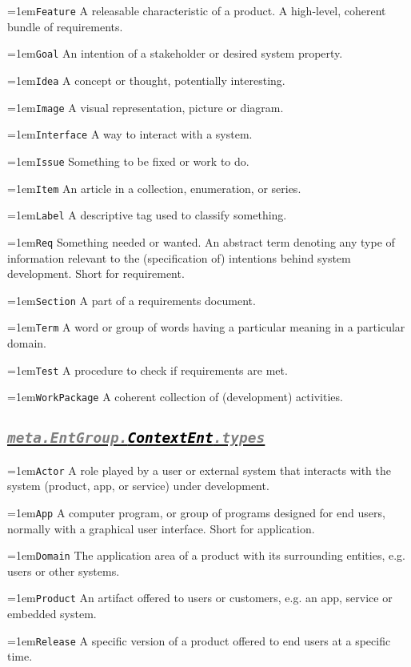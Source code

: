 \documentclass[a4paper,oneside]{article}
\newcommand\Concept[2]{\hangindent=1em\lstinline+#1+ #2}
\begin{document}
\begin{multicols*}{4}
\Concept{Feature}{A releasable characteristic of a product. A high-level, coherent bundle of requirements.}

\Concept{Goal}{An intention of a stakeholder or desired system property.}

\Concept{Idea}{A concept or thought, potentially interesting.}

\Concept{Image}{A visual representation, picture or diagram.}

\Concept{Interface}{A way to interact with a system.}

\Concept{Issue}{Something to be fixed or work to do.}

\Concept{Item}{An article in a collection, enumeration, or series.}

\Concept{Label}{A descriptive tag used to classify something.}

\Concept{Req}{Something needed or wanted. An abstract term denoting any type of information relevant to the (specification of) intentions behind system development. Short for requirement.}

\Concept{Section}{A part of a requirements document.}

\Concept{Term}{A word or group of words having a particular meaning in a particular domain.}

\Concept{Test}{A procedure to check if requirements are met.}

\Concept{WorkPackage}{A coherent collection of (development) activities.}


\subsection*{\underline{\texttt{\textit{{\textcolor{gray}{meta.EntGroup.}\textcolor{black}{ContextEnt}}\textcolor{gray}{.types}}}}}
\Concept{Actor}{A role played by a user or external system that interacts with the system (product, app, or service) under development.}

\Concept{App}{A computer program, or group of programs designed for end users, normally with a graphical user interface. Short for application.}

\Concept{Domain}{The application area of a product with its surrounding entities, e.g. users or other systems.}

\Concept{Product}{An artifact offered to users or customers, e.g. an app, service or  embedded system.}

\Concept{Release}{A specific version of a product offered to end users at a specific time.}


\end{multicols*}
\end{document}
